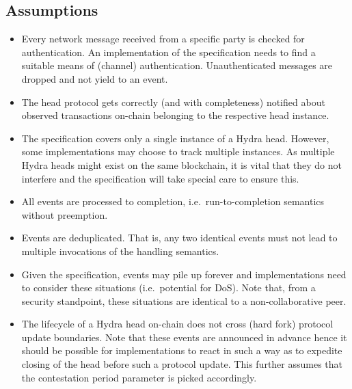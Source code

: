 \subsection{Assumptions}
\begin{itemize}
  \item Every network message received from a specific party is checked for
        authentication. An implementation of the specification needs to find a
        suitable means of (channel) authentication. Unauthenticated messages are
        dropped and not yield to an event.
  \item The head protocol gets correctly (and with completeness) notified about
        observed transactions on-chain belonging to the respective head
        instance.
  \item The specification covers only a single instance of a Hydra head.
        However, some implementations may choose to track multiple instances. As
        multiple Hydra heads might exist on the same blockchain, it is vital
        that they do not interfere and the specification will take special care
        to ensure this.
  \item All events are processed to completion, i.e.\ run-to-completion semantics
        without preemption.
  \item Events are deduplicated. That is, any two identical events must not lead
        to multiple invocations of the handling semantics.
  \item Given the specification, events may pile up forever and implementations
        need to consider these situations (i.e.\ potential for DoS). Note that,
        from a security standpoint, these situations are identical to a
        non-collaborative peer.
  \item The lifecycle of a Hydra head on-chain does not cross (hard fork)
        protocol update boundaries. Note that these events are announced in
        advance hence it should be possible for implementations to react in such
        a way as to expedite closing of the head before such a protocol update.
        This further assumes that the contestation period parameter is picked
        accordingly.
\end{itemize}

